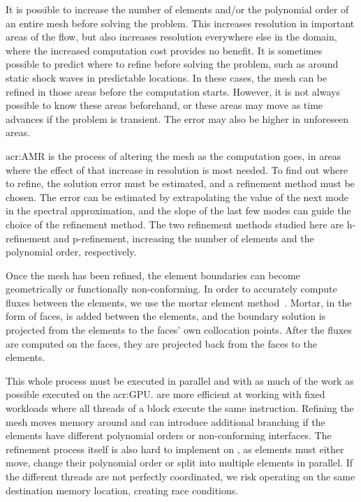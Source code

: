 It is possible to increase the number of elements and/or the polynomial order of an entire mesh
before solving the problem. This increases resolution in important areas of the flow, but also
increases resolution everywhere else in the domain, where the increased computation cost provides no
benefit. It is sometimes possible to predict where to refine before solving the problem, such as
around static shock waves in predictable locations. In these cases, the mesh can be refined in those
areas before the computation starts. However, it is not always possible to know these areas
beforehand, or these areas may move as time advances if the problem is transient. The error may also
be higher in unforeseen areas.

\Acrlong{acr:AMR} is the process of altering the mesh as the computation goes, in areas where the
effect of that increase in resolution is most needed. To find out where to refine, the solution
error must be estimated, and a refinement method must be chosen. The error can be estimated by
extrapolating the value of the next mode in the spectral approximation, and the slope of the last
few modes can guide the choice of the refinement method. The two refinement methods studied here are
h-refinement and p-refinement, increasing the number of elements and the polynomial order,
respectively.

Once the mesh has been refined, the element boundaries can become geometrically or functionally
non-conforming. In order to accurately compute fluxes between the elements, we use the mortar element
method~\cite{Maday1989}. Mortar, in the form of faces, is added between the elements, and the
boundary solution is projected from the elements to the faces' own collocation points. After the
fluxes are computed on the faces, they are projected back from the faces to the elements. 

This whole process must be executed in parallel and with as much of the work as possible executed on
the \acrshort{acr:GPU}.  are more efficient at working with fixed workloads
where all threads of a block execute the same instruction. Refining the mesh moves memory around and
can introduce additional branching if the elements have different polynomial orders or
non-conforming interfaces. The refinement process itself is also hard to implement on
, as elements must either move, change their polynomial order or split into
multiple elements in parallel. If the different threads are not perfectly coordinated, we risk
operating on the same destination memory location, creating race conditions.

